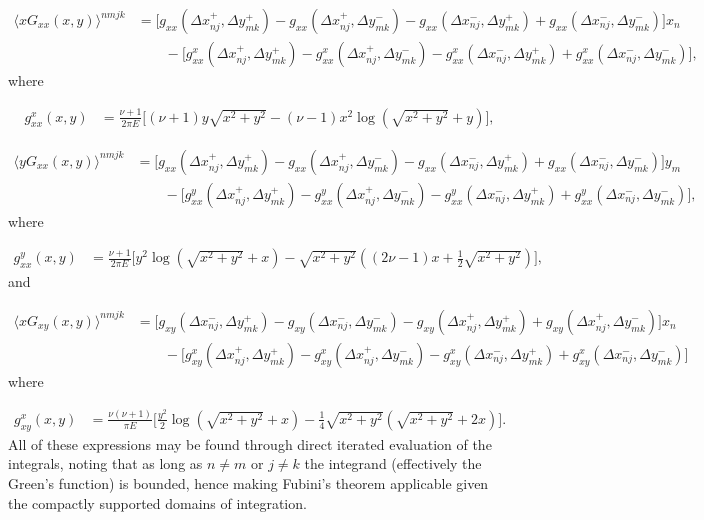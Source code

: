 \documentclass[aps,prl,reprint,twocolumn,groupedaddress,showpacs]{revtex4}
\begin{document}
\begin{widetext}
\begin{align}
\langle xG_{xx}(x,y) \rangle^{nmjk} & =\Big[g_{xx}(\Delta x_{nj}^+,\Delta y_{mk}^+)
- g_{xx}(\Delta x_{nj}^+,\Delta y_{mk}^-)
-g_{xx}(\Delta x_{nj}^-, \Delta y_{mk}^+)+ g_{xx}
(\Delta x_{nj}^- , \Delta y_{mk}^-)\Big] x_n\nonumber\\
\: &\qquad - \Big[g^x_{xx}( \Delta x_{nj}^+ , \Delta y_{mk}^+)- 
g^x_{xx}(\Delta x_{nj}^+ , \Delta y_{mk}^-)-
g^x_{xx}(\Delta x_{nj}^-, \Delta y_{mk}^+) + 
g^x_{xx}(\Delta x_{nj}^- , \Delta y_{mk}^-)\Big],
\end{align}
%
where

\begin{align}
g^x_{xx}(x,y) &= \frac{\nu+1}{2\pi E} \Big[ (\nu+1)y\sqrt{x^2 + y^2}
- (\nu-1) x^2\log\left(\sqrt{x^2 + y^2} +y  \right)  \Big],\label{eq:fxxx}
\end{align}

\begin{align}
\langle yG_{xx}(x,y) \rangle^{nmjk} & = 
\Big[g_{xx}(\Delta x_{nj}^{+},\Delta y_{mk}^+)-g_{xx}(\Delta x_{nj}^+,\Delta y_{mk}^-)
-g_{xx}(\Delta x_{nj}^{-}, \Delta y_{mk}^+) + 
g_{xx}(\Delta x_{nj}^{-}, \Delta y_{mk}^-)\Big] y_m\nonumber\\
\: &\qquad - \Big[ g^y_{xx}(\Delta x_{nj}^+,\Delta y_{mk}^+) 
- g^y_{xx}(\Delta x_{nj}^+,\Delta y_{mk}^-)
- g^y_{xx}(\Delta x_{nj}^-,\Delta y_{mk}^+) 
+ g^y_{xx}(\Delta x_{nj}^-,\Delta y_{mk}^-)\Big],
\end{align}
%
where

\begin{align}
g^y_{xx}(x,y) &=\frac{\nu+1}{2\pi E} \Bigg[y^2\log\left(\sqrt{x^2+y^2}+x \right)
-\sqrt{x^2+y^2}\left((2\nu-1)x + \frac{1}{2}\sqrt{x^2+y^2} \right)  \Bigg], \label{eq:fyxx}
\end{align}
%
and

\begin{align}
\langle xG_{xy}(x,y)\rangle^{nmjk} & = 
\Big[g_{xy}(\Delta x_{nj}^{-},\Delta y_{mk}^+)-g_{xy}(\Delta x_{nj}^{-},\Delta y_{mk}^-)
- g_{xy}(\Delta x_{nj}^{+},\Delta y_{mk}^+) + g_{xy}(\Delta x_{nj}^+,\Delta y_{mk}^-) \Big]x_n \nonumber\\
\: & \qquad -\Big[g_{xy}^x(\Delta x_{nj}^{+},\Delta y_{mk}^+) - g_{xy}^x(\Delta x_{nj}^{+},\Delta y_{mk}^-)
-g_{xy}^x(\Delta x_{nj}^{-},\Delta y_{mk}^+)+g_{xy}^x(\Delta x_{nj}^{-},\Delta y_{mk}^-)\Big]
\end{align}
%
where

\begin{align}
g_{xy}^x(x,y) &=\frac{\nu(\nu+1)}{\pi E}\Big[ \frac{y^2}{2}\log\left(\sqrt{x^2+y^2} +x\right)
-\frac{1}{4}\sqrt{x^2+y^2}\left(\sqrt{x^2+y^2}+2x\right) \Big]. \label{eq:fxxy}
\end{align}
All of these expressions may be found through direct iterated
evaluation of the integrals, noting that as long as $n\neq m$ or
$j\neq k$ the integrand (effectively the Green's function) is bounded,
hence making Fubini's theorem applicable given the compactly supported
domains of integration.


\end{widetext}
\end{document}
